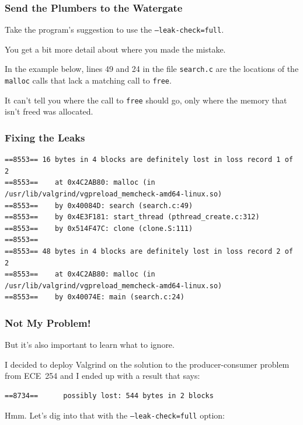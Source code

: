\begin{frame}
\frametitle{Send the Plumbers to the Watergate}


Take the program's suggestion to use the \texttt{--leak-check=full}.

You get a bit more detail about where you made the mistake. 

In the example below, lines 49 and 24 in the file \texttt{search.c} are the locations of the \texttt{malloc} calls that lack a matching call to \texttt{free}. 

It can't tell you where the call to \texttt{free} should go, only where the memory that isn't freed was allocated.

\end{frame}

\begin{frame}[fragile]
\frametitle{Fixing the Leaks}

{\scriptsize
\begin{verbatim}
==8553== 16 bytes in 4 blocks are definitely lost in loss record 1 of 2
==8553==    at 0x4C2AB80: malloc (in /usr/lib/valgrind/vgpreload_memcheck-amd64-linux.so)
==8553==    by 0x40084D: search (search.c:49)
==8553==    by 0x4E3F181: start_thread (pthread_create.c:312)
==8553==    by 0x514F47C: clone (clone.S:111)
==8553== 
==8553== 48 bytes in 4 blocks are definitely lost in loss record 2 of 2
==8553==    at 0x4C2AB80: malloc (in /usr/lib/valgrind/vgpreload_memcheck-amd64-linux.so)
==8553==    by 0x40074E: main (search.c:24)
\end{verbatim}
}

\end{frame}

\begin{frame}[fragile]
\frametitle{Not My Problem!}

But it's also important to learn what to ignore. 

I decided to deploy Valgrind on the solution to the producer-consumer problem from ECE~254 and I ended up with a result that says:

\begin{verbatim}
==8734==      possibly lost: 544 bytes in 2 blocks
\end{verbatim}

Hmm. Let's dig into that with the \texttt{--leak-check=full} option:

\end{frame}

